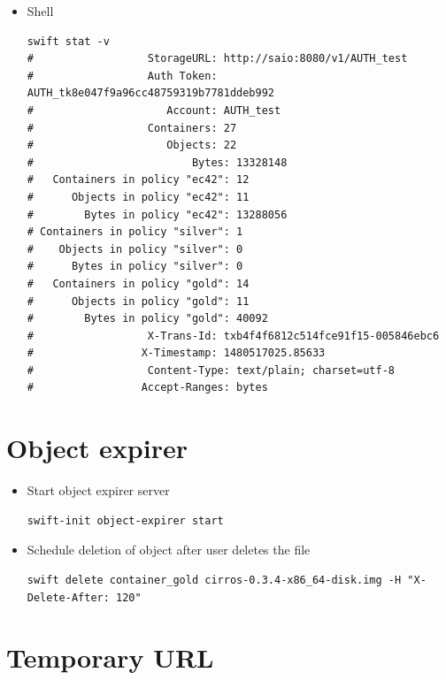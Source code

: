 \documentclass{article}
\begin{document}
\begin{itemize}
\begin{itemize}
\item Shell
\begin{verbatim}
swift stat -v
#     			   StorageURL: http://saio:8080/v1/AUTH_test
#     			   Auth Token: AUTH_tk8e047f9a96cc48759319b7781ddeb992
#     				  Account: AUTH_test
#     			   Containers: 27
#     				  Objects: 22
#                         Bytes: 13328148
#   Containers in policy "ec42": 12
#      Objects in policy "ec42": 11
#        Bytes in policy "ec42": 13288056
# Containers in policy "silver": 1
#    Objects in policy "silver": 0
#      Bytes in policy "silver": 0
#   Containers in policy "gold": 14
#      Objects in policy "gold": 11
#        Bytes in policy "gold": 40092
#     			   X-Trans-Id: txb4f4f6812c514fce91f15-005846ebc6
#     			  X-Timestamp: 1480517025.85633
#                  Content-Type: text/plain; charset=utf-8
#                 Accept-Ranges: bytes
\end{verbatim}
\end{itemize}
\end{itemize}

\section{Object expirer}
\label{sec:orgc86bfb5}

\begin{itemize}
\item Start object expirer server

\begin{verbatim}
swift-init object-expirer start
\end{verbatim}

\item Schedule deletion of object after user deletes the file

\begin{verbatim}
swift delete container_gold cirros-0.3.4-x86_64-disk.img -H "X-Delete-After: 120"
\end{verbatim}
\end{itemize}

\section{Temporary URL}
\label{sec:org157375b}
\end{document}
